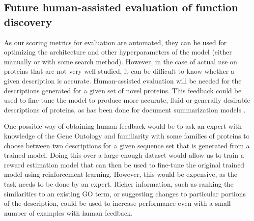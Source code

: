 \documentclass{article}
\begin{document}
\subsection{Future human-assisted evaluation of function discovery}
As our scoring metrics for evaluation are automated, they can be used for optimizing the architecture and other hyperparameters of the model (either manually or with some search method).
However, in the case of actual use on proteins that are not very well studied, it can be difficult to know whether a given description is accurate.
Human-assisted evaluation will be needed for the descriptions generated for a given set of novel proteins.
This feedback could be used to fine-tune the model to produce more accurate, fluid or generally desirable descriptions of proteins, as has been done for document summarization models \citep{finetuningWithHuman, learningToSummarize}.

One possible way of obtaining human feedback would be to ask an expert with knowledge of the Gene Ontology and familiarity with some families of proteins to choose between two descriptions for a given sequence set that is generated from a trained model.
Doing this over a large enough dataset would allow us to train a reward estimation model that can then be used to fine-tune the original trained model using reinforcement learning.
However, this would be expensive, as the task needs to be done by an expert.
Richer information, such as ranking the similarities to an existing GO term, or suggesting changes to particular portions of the description, could be used to increase performance even with a small number of examples with human feedback.
\end{document}
